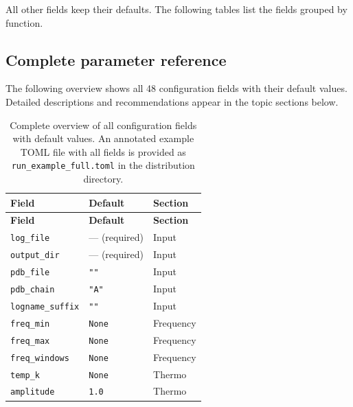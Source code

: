 \documentclass[11pt,a4paper,twoside]{article}
\theoremstyle{remark}
\begin{document}
All other fields keep their defaults. The following tables list
the fields grouped by function.

\subsection{Complete parameter reference}
\label{sec:param-referenz}

The following overview shows all 48 configuration fields with
their default values. Detailed descriptions and recommendations
appear in the topic sections below.

\begin{longtable}{p{} p{} p{}}
\caption{Complete overview of all configuration fields with default
values. An annotated example TOML file with all fields is provided
as \texttt{run\_example\_full.toml} in the distribution directory.}
\label{tab:param-overview} \\
\toprule
\textbf{Field} & \textbf{Default} & \textbf{Section} \\
\midrule
\endfirsthead
\toprule
\textbf{Field} & \textbf{Default} & \textbf{Section} \\
\midrule
\endhead
\texttt{log\_file}                  & --- (required)        & Input \\
\texttt{output\_dir}                & --- (required)        & Input \\
\texttt{pdb\_file}                  & \texttt{""}          & Input \\
\texttt{pdb\_chain}                 & \texttt{"A"}         & Input \\
\texttt{logname\_suffix}            & \texttt{""}          & Input \\
\midrule
\texttt{freq\_min}                  & \texttt{None}        & Frequency \\
\texttt{freq\_max}                  & \texttt{None}        & Frequency \\
\texttt{freq\_windows}              & \texttt{None}        & Frequency \\
\midrule
\texttt{temp\_k}                    & \texttt{None}        & Thermo \\
\texttt{amplitude}                  & \texttt{1.0}         & Thermo \\
\midrule

\end{longtable}
\end{document}

